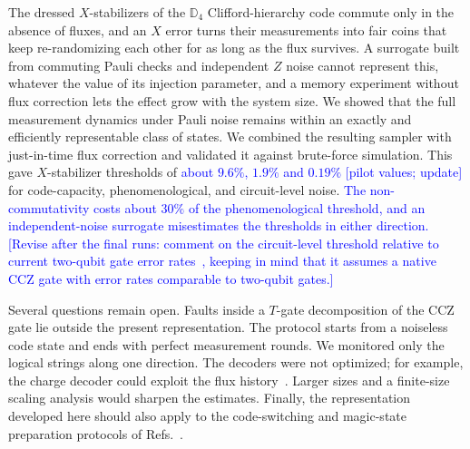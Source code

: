 \documentclass[a4paper]{article}
\newcommand{\blue}[1]{\textcolor{blue}{#1}}
\begin{document}
The dressed $X$-stabilizers of the $\mathbb{D}_4$ Clifford-hierarchy code commute only in the absence of fluxes, and an $X$ error turns their measurements into fair coins that keep re-randomizing each other for as long as the flux survives. A surrogate built from commuting Pauli checks and independent $Z$ noise cannot represent this, whatever the value of its injection parameter, and a memory experiment without flux correction lets the effect grow with the system size. We showed that the full measurement dynamics under Pauli noise remains within an exactly and efficiently representable class of states. We combined the resulting sampler with just-in-time flux correction and validated it against brute-force simulation. This gave $X$-stabilizer thresholds of \blue{about $9.6\%$, $1.9\%$ and $0.19\%$ [pilot values; update]} for code-capacity, phenomenological, and circuit-level noise. \blue{The non-commutativity costs about $30\%$ of the phenomenological threshold, and an independent-noise surrogate misestimates the thresholds in either direction.} \blue{[Revise after the final runs: comment on the circuit-level threshold relative to current two-qubit gate error rates~\cite{Hughes2025}, keeping in mind that it assumes a native CCZ gate with error rates comparable to two-qubit gates.]}

Several questions remain open. Faults inside a $T$-gate decomposition of the CCZ gate lie outside the present representation. The protocol starts from a noiseless code state and ends with perfect measurement rounds. We monitored only the logical strings along one direction. The decoders were not optimized; for example, the charge decoder could exploit the flux history~\cite{magdalena2026}. Larger sizes and a finite-size scaling analysis would sharpen the estimates. Finally, the representation developed here should also apply to the code-switching and magic-state preparation protocols of Refs.~\cite{kobayashi2025clifford,davydova2025knots}.
\end{document}
